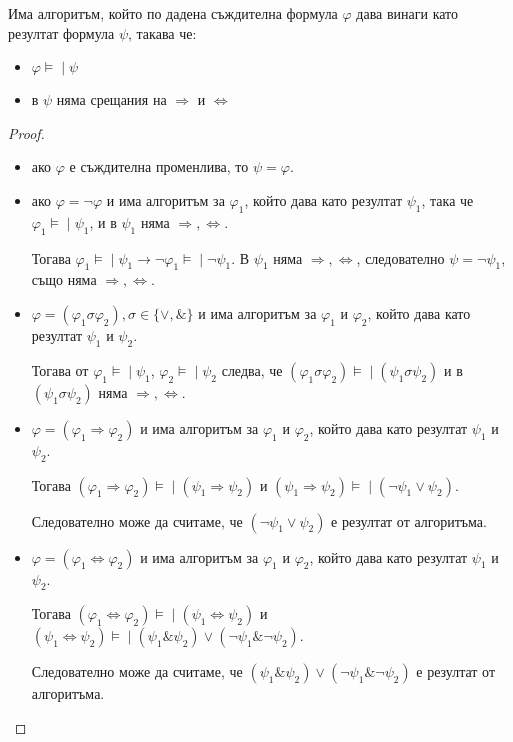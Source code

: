 \documentclass{article}
\newcommand{\mymod}{\models\!\mid}
\def\Proofs{1}
\begin{document}
\begin{claim} \label{algo-phi-psi}
Има алгоритъм, който по дадена съждителна формула $\varphi$ дава винаги като резултат формула $\psi$, такава че:
\begin{itemize}
\item $\varphi \mymod \psi$
\item в $\psi$ няма срещания на $\Rightarrow$ и $\Leftrightarrow$
\end{itemize}


\ifcase\Proofs\or
\begin{proof}
$\ $

\begin{itemize}
\item ако $\varphi$ е съждителна променлива, то $\psi = \varphi$.
\item ако $\varphi = \neg\varphi$ и има алгоритъм за $\varphi_1$, който дава като резултат $\psi_1$, така че $\varphi_1 \mymod \psi_1$, и в $\psi_1$ няма $\Rightarrow, \Leftrightarrow$.

Тогава $\varphi_1 \mymod \psi_1 \longrightarrow \neg\varphi_1 \mymod \neg\psi_1$. В $\psi_1$ няма $\Rightarrow, \Leftrightarrow$, следователно $\psi = \neg\psi_1$, също няма $\Rightarrow, \Leftrightarrow$.
\item $\varphi = (\varphi_1 \sigma \varphi_2), \sigma \in \{\lor, \&\}$ и има алгоритъм за $\varphi_1$ и $\varphi_2$, който дава като резултат $\psi_1$ и $\psi_2$.

Тогава от $\varphi_1 \mymod \psi_1$, $\varphi_2 \mymod \psi_2$ следва, че $(\varphi_1 \sigma \varphi_2) \mymod (\psi_1 \sigma \psi_2)$ и в $(\psi_1 \sigma \psi_2)$ няма $\Rightarrow, \Leftrightarrow$.

\item $\varphi = (\varphi_1 \Rightarrow \varphi_2)$ и има алгоритъм за $\varphi_1$ и $\varphi_2$, който дава като резултат $\psi_1$ и $\psi_2$.

Тогава $(\varphi_1 \Rightarrow \varphi_2) \mymod (\psi_1 \Rightarrow \psi_2)$ и $(\psi_1 \Rightarrow \psi_2) \mymod (\neg\psi_1 \lor \psi_2)$. 

Следователно може да считаме, че $(\neg\psi_1 \lor \psi_2)$ е резултат от алгоритъма.

\item $\varphi = (\varphi_1 \Leftrightarrow \varphi_2)$ и има алгоритъм за $\varphi_1$ и $\varphi_2$, който дава като резултат $\psi_1$ и $\psi_2$.

Тогава $(\varphi_1 \Leftrightarrow \varphi_2) \mymod (\psi_1 \Leftrightarrow \psi_2)$ и $(\psi_1 \Leftrightarrow \psi_2) \mymod (\psi_1 \& \psi_2) \lor (\neg\psi_1 \& \neg\psi_2)$.

Следователно може да считаме, че $(\psi_1 \& \psi_2) \lor (\neg\psi_1 \& \neg\psi_2)$ е резултат от алгоритъма.
\end{itemize}
\end{proof}
\fi

\end{claim}
\end{document}
